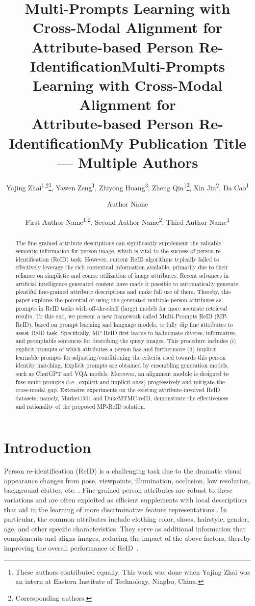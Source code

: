 \documentclass[letterpaper]{article} %
\title{Multi-Prompts Learning with Cross-Modal Alignment for\\
Attribute-based Person Re-Identification}
\author{
    Yajing Zhai\textsuperscript{\rm 1,2}\thanks{These authors contributed equally. This work was done when Yajing Zhai was an intern at Eastern Institute of Technology, Ningbo, China.},
    Yawen Zeng\textsuperscript{\rm 1}\footnotemark[1],
    Zhiyong Huang\textsuperscript{\rm 3},
    Zheng Qin\textsuperscript{\rm 1}\thanks{Corresponding authors.},
    Xin Jin\textsuperscript{\rm 2}\footnotemark[2],
    Da Cao\textsuperscript{\rm 1}
}
\title{Multi-Prompts Learning with Cross-Modal Alignment for\\
Attribute-based Person Re-Identification}
\author {
    Author Name
}
\title{My Publication Title --- Multiple Authors}
\author {
    First Author Name\textsuperscript{\rm 1,\rm 2},
    Second Author Name\textsuperscript{\rm 2},
    Third Author Name\textsuperscript{\rm 1}
}
\begin{document}
\maketitle

\begin{abstract}
The fine-grained attribute descriptions can significantly supplement the valuable semantic information for person image, which is vital to the success of person re-identification (ReID) task. However, current ReID algorithms typically failed to effectively leverage the rich contextual information available, primarily due to their reliance on simplistic and coarse utilization of image attributes. Recent advances in artificial intelligence generated content have made it possible to automatically generate plentiful fine-grained attribute descriptions and make full use of them. Thereby, this paper explores the potential of using the generated multiple person attributes as prompts in ReID tasks with off-the-shelf (large) models for more accurate retrieval results. To this end, we present a new framework called Multi-Prompts ReID (MP-ReID), based on prompt learning and language models, to fully dip fine attributes to assist ReID task. Specifically, MP-ReID first learns to hallucinate diverse, informative, and promptable sentences for describing the query images. This procedure includes (i) explicit prompts of which attributes a person has and furthermore (ii) implicit learnable prompts for adjusting/conditioning the criteria used towards this person identity matching. Explicit prompts are obtained by ensembling generation models, such as ChatGPT and VQA models. Moreover, an alignment module is designed to fuse multi-prompts (i.e., explicit and implicit ones) progressively and mitigate the cross-modal gap. Extensive experiments on the existing attribute-involved ReID datasets, namely, Market1501 and DukeMTMC-reID, demonstrate the effectiveness and rationality of the proposed MP-ReID solution.
\end{abstract}

\section{Introduction}

Person re-identification (ReID) is a challenging task due to the dramatic visual appearance changes from pose, viewpoints, illumination, occlusion, low resolution, background clutter, etc. \cite{jin2020uncertainty,ye2021deep,zhang2021person}. Fine-grained person attributes are robust to these variations and are often exploited as efficient supplements with local descriptions that aid in the learning of more discriminative feature representations \cite{jia2022learning,wang2022pedestrian}. In particular, the common attributes include clothing color, shoes, hairstyle, gender, age, and other specific characteristics. They serve as additional information that complements and aligns images, reducing the impact of the above factors, thereby improving the overall performance of ReID~\cite{yu2022multi}.
\end{document}
